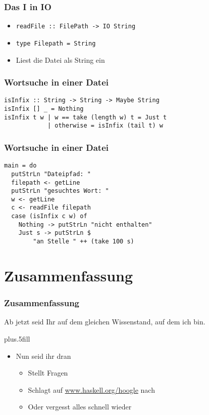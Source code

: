 \documentclass[fleqn,11pt,aspectratio=43]{beamer}
\begin{document}
\begin{frame}
\frametitle{Das I in IO}
\begin{block}{\vspace*{-3ex}}
\begin{itemize}
  \item \lstinline|readFile :: FilePath -> IO String|
  \item \lstinline|type Filepath = String|
  \item Liest die Datei als String ein
\end{itemize}
\end{block}
\end{frame}

\begin{frame}[fragile]
\frametitle{Wortsuche in einer Datei}
\begin{lstlisting}
isInfix :: String -> String -> Maybe String
isInfix [] _ = Nothing
isInfix t w | w == take (length w) t = Just t
            | otherwise = isInfix (tail t) w
\end{lstlisting}	
\end{frame}

\begin{frame}[fragile]
\frametitle{Wortsuche in einer Datei}
\begin{lstlisting}
main = do
  putStrLn "Dateipfad: "
  filepath <- getLine
  putStrLn "gesuchtes Wort: "
  w <- getLine
  c <- readFile filepath
  case (isInfix c w) of
    Nothing -> putStrLn "nicht enthalten"
    Just s -> putStrLn $
        "an Stelle " ++ (take 100 s)
\end{lstlisting}	
\end{frame}

\section*{Zusammenfassung}

\begin{frame}
\frametitle{Zusammenfassung}
\begin{block}{\vspace*{-3ex}}
Ab jetzt seid Ihr auf dem gleichen Wissenstand, auf dem ich bin.

\vskip0pt plus.5fill
\begin{itemize}
  \item Nun seid ihr dran
  \begin{itemize}
    \item Stellt Fragen
    \item Schlagt auf \url{www.haskell.org/hoogle} nach 
    \item Oder vergesst alles schnell wieder
  \end{itemize}
\end{itemize}
\end{block}
\end{frame}
\end{document}
